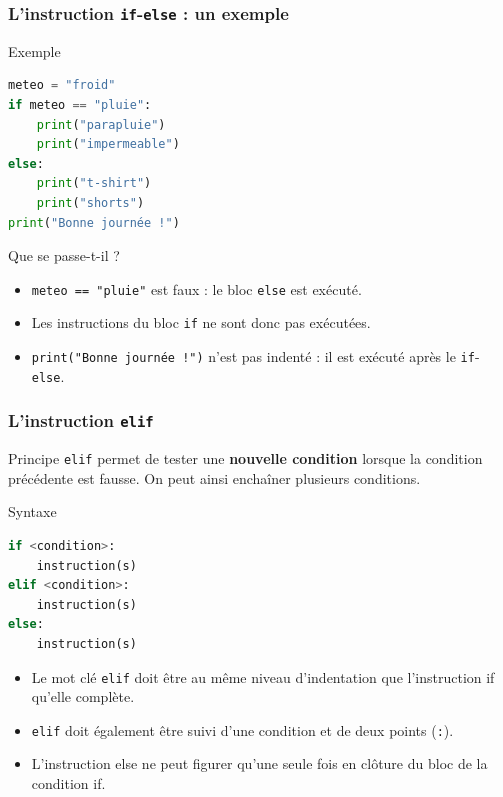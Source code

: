 \documentclass[10pt]{beamer}
\begin{document}
\begin{frame}[containsverbatim]
	\frametitle{L'instruction \texttt{if}-\texttt{else} : un exemple}
	
\begin{exampleblock}{Exemple}
\begin{lstlisting}[language=Python]
meteo = "froid"
if meteo == "pluie":
	print("parapluie")
	print("impermeable")
else:
	print("t-shirt")
	print("shorts")
print("Bonne journée !")
\end{lstlisting}
\end{exampleblock}
	
	
	\vspace{0.15cm}
	
	\begin{block}{Que se passe-t-il ?}
		\begin{itemize}
			\item \texttt{meteo == "pluie"} est faux : le bloc \texttt{else} est exécuté.
			\item Les instructions du bloc \texttt{if} ne sont donc pas exécutées.
			\item \texttt{print("Bonne journée !")} n'est pas indenté :
			il est exécuté après le \texttt{if}-\texttt{else}.
		\end{itemize}
	\end{block}
	
	
\end{frame}
\begin{frame}[containsverbatim]
	\frametitle{L'instruction \texttt{elif}}
	
	
	\begin{block}{Principe}
		\texttt{elif} permet de tester une \textbf{nouvelle condition}
		lorsque la condition précédente est fausse.
		On peut ainsi enchaîner plusieurs conditions.
	\end{block}
	
	
\begin{alertblock}{Syntaxe}
\begin{lstlisting}[language=Python]
if <condition>:
	instruction(s)
elif <condition>:
	instruction(s)
else:
	instruction(s)
\end{lstlisting}
\end{alertblock}
	


\begin{itemize}
	\item    Le mot clé \texttt{elif} doit être au même niveau d'indentation que l'instruction if qu'elle complète.
	\item    \texttt{elif} doit également être suivi d'une condition et de deux points (\texttt{:}).
	\item  L'instruction else ne peut figurer qu'une seule fois en clôture du bloc de la condition if.
\end{itemize}

	
	
\end{frame}
\end{document}
